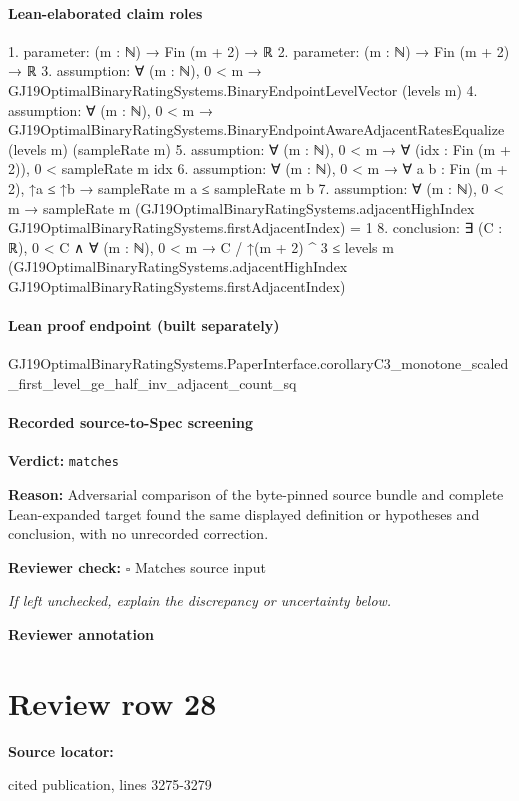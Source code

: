 \documentclass[10pt]{article}
\newcommand{\reviewerbox}{%
  \par\noindent\fbox{\parbox{0.96\linewidth}{\rule{0pt}{0.38in}}}\par
}
\newcommand{\reviewmatch}[1]{%
  \par\noindent\textbf{Reviewer check:} $\square$\; #1\par
  \noindent\emph{If left unchecked, explain the discrepancy or uncertainty below.}\par
}
\begin{document}
\paragraph{Lean-elaborated claim roles}\begin{ReviewVerbatim}
1. parameter: (m : ℕ) → Fin (m + 2) → ℝ
2. parameter: (m : ℕ) → Fin (m + 2) → ℝ
3. assumption: ∀ (m : ℕ), 0 < m → GJ19OptimalBinaryRatingSystems.BinaryEndpointLevelVector (levels m)
4. assumption: ∀ (m : ℕ), 0 < m → GJ19OptimalBinaryRatingSystems.BinaryEndpointAwareAdjacentRatesEqualize (levels m) (sampleRate m)
5. assumption: ∀ (m : ℕ), 0 < m → ∀ (idx : Fin (m + 2)), 0 < sampleRate m idx
6. assumption: ∀ (m : ℕ), 0 < m → ∀ {a b : Fin (m + 2)}, ↑a ≤ ↑b → sampleRate m a ≤ sampleRate m b
7. assumption: ∀ (m : ℕ),
  0 < m →
    sampleRate m (GJ19OptimalBinaryRatingSystems.adjacentHighIndex GJ19OptimalBinaryRatingSystems.firstAdjacentIndex) =
      1
8. conclusion: ∃ (C : ℝ),
  0 < C ∧
    ∀ (m : ℕ),
      0 < m →
        C / ↑(m + 2) ^ 3 ≤
          levels m (GJ19OptimalBinaryRatingSystems.adjacentHighIndex GJ19OptimalBinaryRatingSystems.firstAdjacentIndex)
\end{ReviewVerbatim}

\paragraph{Lean proof endpoint (built separately)}\begin{ReviewVerbatim}
GJ19OptimalBinaryRatingSystems.PaperInterface.corollaryC3_monotone_scaled_first_level_ge_half_inv_adjacent_count_sq
\end{ReviewVerbatim}

\paragraph{Recorded source-to-Spec screening}
\textbf{Verdict:} \texttt{matches}
\\
{\raggedright
\textbf{Reason:} Adversarial comparison of the byte-\allowbreak{}pinned source bundle and complete Lean-\allowbreak{}expanded target found the same displayed definition or hypotheses and conclusion, with no unrecorded correction.\allowbreak{}
\par}
\reviewmatch{Matches source input}
\noindent\textbf{Reviewer annotation}\par
\reviewerbox
\clearpage
\hypertarget{source-claim-8cc85076f8ab0b2b}{}
\section*{Review row 28}
\textbf{Source locator:} {\footnotesize\raggedright cited publication, lines 3275-\allowbreak{}3279\par}
\end{document}
